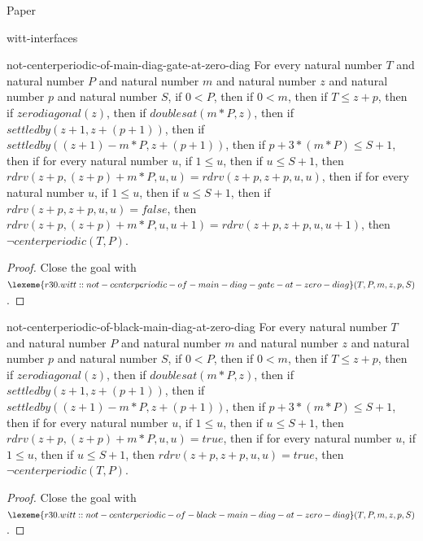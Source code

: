 \begin{lexlean}{Paper}
\begin{section}{witt-interfaces}
  \begin{theorem}{not-centerperiodic-of-main-diag-gate-at-zero-diag}
  For every natural number \(T\) and natural number \(P\) and natural number \(m\) and natural number \(z\) and natural number \(p\) and natural number \(S\), if \(0 < P\), then if \(0 < m\), then if \(T ≤ z + p\), then if \(zerodiagonal(z)\), then if \(doublesat(m * P, z)\), then if \(settledby(z + 1, z + (p + 1))\), then if \(settledby((z + 1) - m * P, z + (p + 1))\), then if \(p + 3 * (m * P) ≤ S + 1\), then if for every natural number \(u\), if \(1 ≤ u\), then if \(u ≤ S + 1\), then \(rdrv(z + p, (z + p) + m * P, u, u) = rdrv(z + p, z + p, u, u)\), then if for every natural number \(u\), if \(1 ≤ u\), then if \(u ≤ S + 1\), then if \(rdrv(z + p, z + p, u, u) = false\), then \(rdrv(z + p, (z + p) + m * P, u, u + 1) = rdrv(z + p, z + p, u, u + 1)\), then \(¬ centerperiodic(T, P)\).
  \begin{proof}
  Close the goal with \(\lexeme{r30.witt::not-centerperiodic-of-main-diag-gate-at-zero-diag}(T, P, m, z, p, S)\).
  \end{proof}
  \end{theorem}

  \begin{theorem}{not-centerperiodic-of-black-main-diag-at-zero-diag}
  For every natural number \(T\) and natural number \(P\) and natural number \(m\) and natural number \(z\) and natural number \(p\) and natural number \(S\), if \(0 < P\), then if \(0 < m\), then if \(T ≤ z + p\), then if \(zerodiagonal(z)\), then if \(doublesat(m * P, z)\), then if \(settledby(z + 1, z + (p + 1))\), then if \(settledby((z + 1) - m * P, z + (p + 1))\), then if \(p + 3 * (m * P) ≤ S + 1\), then if for every natural number \(u\), if \(1 ≤ u\), then if \(u ≤ S + 1\), then \(rdrv(z + p, (z + p) + m * P, u, u) = true\), then if for every natural number \(u\), if \(1 ≤ u\), then if \(u ≤ S + 1\), then \(rdrv(z + p, z + p, u, u) = true\), then \(¬ centerperiodic(T, P)\).
  \begin{proof}
  Close the goal with \(\lexeme{r30.witt::not-centerperiodic-of-black-main-diag-at-zero-diag}(T, P, m, z, p, S)\).
  \end{proof}
  \end{theorem}


\end{section}
\end{lexlean}
